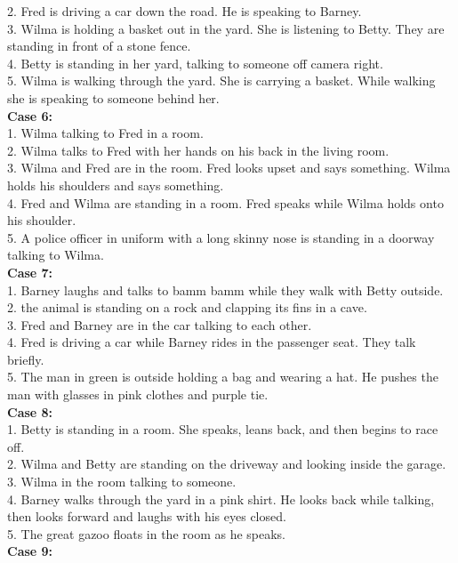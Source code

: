 \documentclass[10pt,twocolumn,letterpaper]{article}
\begin{document}
{{2. Fred is driving a car down the road. He is speaking to Barney.\\
3. Wilma is holding a basket out in the yard. She is listening to Betty. They are standing in front of a stone fence.\\
4. Betty is standing in her yard, talking to someone off camera right.\\
5. Wilma is walking through the yard. She is carrying a basket. While walking she is speaking to someone behind her.\\
\textbf{Case 6:}\\
1. Wilma talking to Fred in a room.\\
2. Wilma talks to Fred with her hands on his back in the living room.\\
3. Wilma and Fred are in the room. Fred looks upset and says something. Wilma holds his shoulders and says something.\\
4. Fred and Wilma are standing in a room. Fred speaks while Wilma holds onto his shoulder.\\
5. A police officer in uniform with a long skinny nose is standing in a doorway talking to Wilma.\\
\textbf{Case 7:}\\
1. Barney laughs and talks to bamm bamm while they walk with Betty outside.\\
2. the animal is standing on a rock and clapping its fins in a cave.\\
3. Fred and Barney are in the car talking to each other.\\
4. Fred is driving a car while Barney rides in the passenger seat. They talk briefly.\\
5. The man in green is outside holding a bag and wearing a hat. He pushes the man with glasses in pink clothes and purple tie.\\
\textbf{Case 8:}\\
1. Betty is standing in a room. She speaks, leans back, and then begins to race off.\\
2. Wilma and Betty are standing on the driveway and looking inside the garage.\\
3. Wilma in the room talking to someone.\\
4. Barney walks through the yard in a pink shirt. He looks back while talking, then looks forward and laughs with his eyes closed.\\
5. The great gazoo floats in the room as he speaks.\\
\textbf{Case 9:}\\
}}
\end{document}
